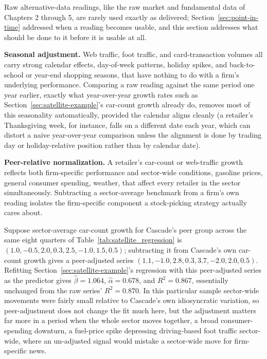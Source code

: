 \documentclass[../ai_in_finance]{subfiles}
\begin{document}
Raw alternative-data readings, like the raw market and fundamental data of Chapters 2 through 5, are rarely used exactly as delivered; Section~\ref{sec:point-in-time} addressed when a reading becomes usable, and this section addresses what should be done to it before it is usable at all.

\textbf{Seasonal adjustment.} Web traffic, foot traffic, and card-transaction volumes all carry strong calendar effects, day-of-week patterns, holiday spikes, and back-to-school or year-end shopping seasons, that have nothing to do with a firm's underlying performance. Comparing a raw reading against the same period one year earlier, exactly what year-over-year growth rates such as Section~\ref{sec:satellite-example}'s car-count growth already do, removes most of this seasonality automatically, provided the calendar aligns cleanly (a retailer's Thanksgiving week, for instance, falls on a different date each year, which can distort a naive year-over-year comparison unless the alignment is done by trading day or holiday-relative position rather than by calendar date).

\textbf{Peer-relative normalization.} A retailer's car-count or web-traffic growth reflects both firm-specific performance and sector-wide conditions, gasoline prices, general consumer spending, weather, that affect every retailer in the sector simultaneously. Subtracting a sector-average benchmark from a firm's own reading isolates the firm-specific component a stock-picking strategy actually cares about.

Suppose sector-average car-count growth for Cascade's peer group across the same eight quarters of Table~\ref{tab:satellite_regression} is $(1.0, -0.5, 2.0, 0.3, 2.5, -1.0, 1.5, 0.5)$; subtracting it from Cascade's own car-count growth gives a peer-adjusted series $(1.1, -1.0, 2.8, 0.3, 3.7, -2.0, 2.0, 0.5)$. Refitting Section~\ref{sec:satellite-example}'s regression with this peer-adjusted series as the predictor gives $\hat\beta = 1.064$, $\hat\alpha = 0.678$, and $R^2 = 0.867$, essentially unchanged from the raw series' $R^2 = 0.870$. In this particular sample sector-wide movements were fairly small relative to Cascade's own idiosyncratic variation, so peer-adjustment does not change the fit much here, but the adjustment matters far more in a period when the whole sector moves together, a broad consumer-spending downturn, a fuel-price spike depressing driving-based foot traffic sector-wide, where an un-adjusted signal would mistake a sector-wide move for firm-specific news.
\end{document}
